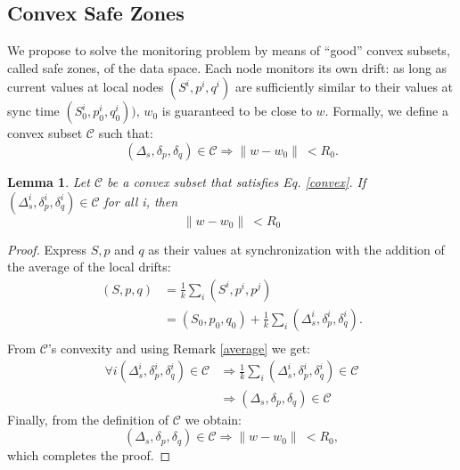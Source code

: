 \documentclass[11pt,twocolumn,varwidth=true,a4paper,fleqn]{article}
\newtheorem{lemma}{Lemma}
\begin{document}
\subsection{Convex Safe Zones}
We propose to solve the monitoring problem by means of
``good'' convex subsets, called safe zones, of the data space.
Each node monitors its own drift: as long as current values
at local nodes $(S^i,p^i,q^i)$ are sufficiently similar to their values
at sync time $(S^i_0,p^i_0,q^i_0))$, $w_0$ is guaranteed to be close to $w$.
Formally, we define a convex subset $\mathcal{C}$ such that:
\begin{equation} \label{convex}
(\Delta_s, \delta_p, \delta_q) \in \mathcal{C} \Rightarrow \parallel w-w_0
\parallel \ < R_0.
\end{equation}
\begin{lemma}
Let $\mathcal{C}$ be a convex subset that satisfies Eq. \ref{convex}.
If $(\Delta_s^i, \delta_p^i, \delta_q^i) \in \mathcal{C}$ for all i, then
\begin{equation*}
\parallel w-w_0 \parallel \ < R_0
\end{equation*}
\end{lemma}
\begin{proof}
Express $S, p$ and $q$ as their values at synchronization with the addition of the
average of the local drifts:
\begin{equation*} 
\begin{split}
(S,p,q) & = \frac{1}{k} \sum_i (S^i,p^i,p^j) \\
 & = (S_0,p_0,q_0) + \frac{1}{k} \sum_i (\Delta_s^i,\delta^i_p,\delta_q^i). \\
\end{split}
\end{equation*}
From $\mathcal{C}$'s convexity and using Remark \ref{average} we get:
\begin{equation*} 
\begin{split}
\forall i (\Delta_s^i,\delta^i_p,\delta_q^i) \in \mathcal{C} & \Rightarrow 
\frac{1}{k} \sum_i (\Delta_s^i,\delta^i_p,\delta_q^i) \in \mathcal{C} \\
& \Rightarrow (\Delta_s,\delta_p,\delta_q) \in \mathcal{C}
\end{split}
\end{equation*}
Finally, from the definition of $\mathcal{C}$ we obtain:
\begin{equation*}
(\Delta_s,\delta_p,\delta_q) \in \mathcal{C} \Rightarrow \parallel w-w_0
\parallel \ < R_0,
\end{equation*}
which completes the proof.
\end{proof}
\end{document}
